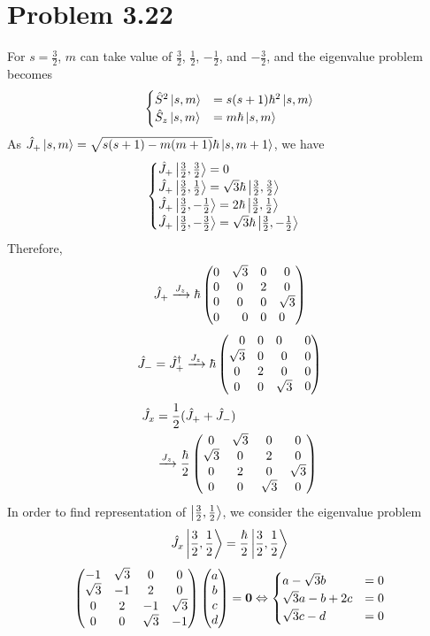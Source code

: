\documentclass{article}
\begin{document}
\section*{Problem 3.22}
For $s=\frac{3}{2}$, $m$ can take value of $\frac{3}{2}$, $\frac{1}{2}$, $-\frac{1}{2}$, and $-\frac{3}{2}$, and the eigenvalue problem becomes
\[ 
    \begin{cases}
        \hat{S}^2 \ket{s,m} &= s(s+1) \hbar^2 \ket{s,m} \\
        \hat{S}_z \ket{s,m} &= m \hbar \ket{s,m}
    \end{cases}
\]
As $\hat{J}_+ \ket{s,m} = \sqrt{s(s+1)-m(m+1)} \hbar \ket{s,m+1}$, we have
\[
    \begin{cases}
        \hat{J}_+ \ket{\frac{3}{2}, \frac{3}{2}}
        = 0 \\
        \hat{J}_+ \ket{\frac{3}{2}, \frac{1}{2}}
        = \sqrt{3} \hbar \ket{\frac{3}{2}, \frac{3}{2}} \\
        \hat{J}_+ \ket{\frac{3}{2}, -\frac{1}{2}}
        = 2 \hbar \ket{\frac{3}{2}, \frac{1}{2}} \\
        \hat{J}_+ \ket{\frac{3}{2}, -\frac{3}{2}}
        = \sqrt{3} \hbar \ket{\frac{3}{2}, -\frac{1}{2}} \\
    \end{cases}
\] 
Therefore,
\[
    \hat{J}_+ \xrightarrow{J_z}
    \hbar \pmqty{\mqty{0\\0\\0} & \mqty{\dmat[0]{\sqrt{3},2,\sqrt{3}}}\\ 0 & \mqty{0&0&0}}
\] 
\[
    \hat{J}_- = \hat{J}_+^\dagger \xrightarrow{J_z}
    \hbar \pmqty{\mqty{0 & 0 & 0} & \mqty{0} \\ \mqty{\dmat[0]{\sqrt{3}, 2, \sqrt{3}}} & \mqty{0 \\ 0 \\ 0}} 
\]
\[
  \begin{split}
      \hat{J}_x &= \frac{1}{2} (\hat{J}_+ + \hat{J}_-) \\
      &\xrightarrow{J_z}
      \frac{\hbar}{2} \pmqty{0 & \sqrt{3} & 0 & 0 \\ \sqrt{3} & 0 & 2 & 0 \\ 0 & 2 & 0 & \sqrt{3} \\ 0 & 0 & \sqrt{3} & 0}
  \end{split}  
\]
In order to find representation of $\ket{\frac{3}{2}, \frac{1}{2}}$, we consider the eigenvalue problem
\[
    \hat{J}_x \ket{\frac{3}{2}, \frac{1}{2}}
    =\frac{\hbar}{2} \ket{\frac{3}{2}, \frac{1}{2}}
\]
\[
    \pmqty{-1 & \sqrt{3} & 0 & 0 \\ \sqrt{3} & -1 & 2 & 0 \\ 0 & 2 & -1 & \sqrt{3} \\ 0 & 0 & \sqrt{3} & -1} 
    \pmqty{a \\ b \\ c \\ d} = \vb{0}
    \Leftrightarrow 
    \begin{cases}
        a - \sqrt{3} b &=0\\
        \sqrt{3}a -b+2c &=0 \\
        \sqrt{3}c-d&=0
    \end{cases}
\]
\end{document}
